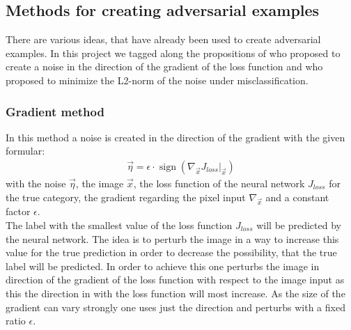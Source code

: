 \documentclass[%
 reprint,
 amsmath,amssymb,
 aps,
]{revtex4-1}
\begin{document}
\subsection{Methods for creating adversarial examples}

There are various ideas, that have already been used to create adversarial examples. In this project we tagged along the propositions of \citeauthor{paperGrad} who proposed to create a noise in the direction of the gradient of the loss function and \citeauthor{paperMinimize} who proposed to minimize the L2-norm of the noise under misclassification.
\subsubsection*{Gradient method}
In this method a noise is created in the direction of the gradient with the given formular:
\begin{align*}
\vec{\eta} = \epsilon \cdot \operatorname{sign} \left( \nabla_{\vec{x}} J_{loss} \big \vert_{\vec{x}} \right)
\end{align*}
with the noise $\vec{\eta}$, the image $\vec{x}$, the loss function of the neural network $J_{loss}$ for the true category, the gradient regarding the pixel input $\nabla_{\vec{x}}$ and a constant factor $\epsilon$.\\
The label with the smallest value of the loss function $J_{loss}$ will be predicted by the neural network. The idea is to perturb the image in a way to increase this value for the true prediction in order to decrease the possibility, that the true label will be predicted. In order to achieve this one perturbs the image in direction of the gradient of the loss function with respect to the image input as this the direction in with the loss function will most increase. As the size of the gradient can vary strongly one uses just the direction and perturbs with a fixed ratio $\epsilon$. \cite{paperGrad}
\end{document}
